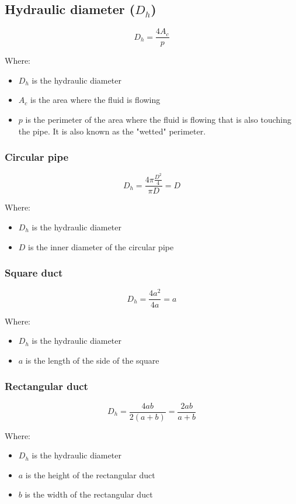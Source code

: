 \documentclass[11pt]{article}
\begin{document}
\subsection{Hydraulic diameter (\(D_h\))}
\label{sec:org9bcb2c0}
\[D_h = \frac{4 A_c}{p}\]

Where:
\begin{itemize}
\item \(D_h\) is the hydraulic diameter
\item \(A_c\) is the area where the fluid is flowing
\item \(p\) is the perimeter of the area where the fluid is flowing that is also touching the pipe. It is also known as the "wetted" perimeter.
\end{itemize}
\subsubsection{Circular pipe}
\label{sec:org16b2698}
\[D_h = \frac{4 \pi \frac{D^2}{4}}{\pi D} = D\]

Where:
\begin{itemize}
\item \(D_h\) is the hydraulic diameter
\item \(D\) is the inner diameter of the circular pipe
\end{itemize}
\subsubsection{Square duct}
\label{sec:orgfd0068b}
\[D_h = \frac{4a^2}{4a} = a\]

Where:
\begin{itemize}
\item \(D_h\) is the hydraulic diameter
\item \(a\) is the length of the side of the square
\end{itemize}
\subsubsection{Rectangular duct}
\label{sec:org12e73d2}
\[D_h = \frac{4ab}{2(a + b)} = \frac{2ab}{a + b}\]

Where:
\begin{itemize}
\item \(D_h\) is the hydraulic diameter
\item \(a\) is the height of the rectangular duct
\item \(b\) is the width of the rectangular duct
\end{itemize}
\end{document}
